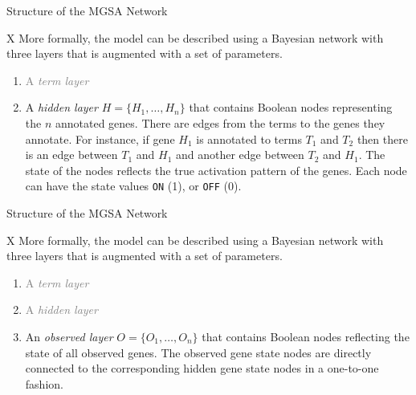 \documentclass{beamer}
\begin{document}
\begin{frame}[fragile]{Structure of the MGSA Network}
 \begin{mybluebox}{X}
  More formally, the model can be described using a Bayesian network with three
layers that is augmented with a set of parameters.
 \end{mybluebox}
\begin{enumerate}
 \item \textcolor{gray}{A \emph{term layer}  }
 \item A \emph{hidden layer} $H=\{H_1,\ldots,H_n\}$ that contains Boolean nodes
 representing the $n$ annotated genes. There are edges
 from the terms to the genes they annotate.
 For instance, if gene $H_1$ is annotated to terms $T_1$ and $T_2$ then there is an edge between 
$T_1$ and $H_1$
 and another edge between $T_2$ and $H_1$. The state of the nodes reflects the
 true activation pattern of the genes. Each node can have the state
values \texttt{ON} (1), or \texttt{OFF} (0). 
\end{enumerate}
\end{frame}

\begin{frame}[fragile]{Structure of the MGSA Network}
 \begin{mybluebox}{X}
  More formally, the model can be described using a Bayesian network with three
layers that is augmented with a set of parameters.
 \end{mybluebox}
\begin{enumerate}
 \item \textcolor{gray}{A \emph{term layer}  }
 \item \textcolor{gray}{A \emph{hidden layer}}
 \item An \emph{observed layer} $O=\{O_1,\ldots,O_n\}$ that contains Boolean
 nodes reflecting the state of all observed genes. The observed gene state nodes are
 directly connected to the corresponding hidden gene state nodes in a
 one-to-one fashion.
\end{enumerate}
\end{frame}
 
\end{document}
